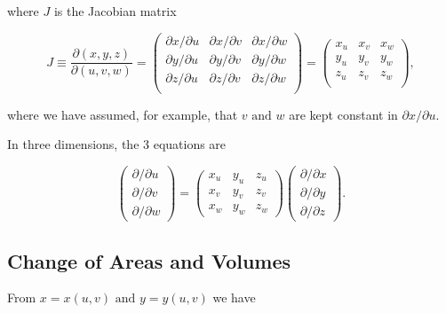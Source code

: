 \documentclass[english,a4paper,12pt]{report}
\begin{document}
where \(J\) is the Jacobian matrix 

\begin{equation}
	J \equiv \frac{\partial (x,y,z)}{\partial (u,v,w)} = \begin{pmatrix}
		\partial x/\partial u  & \partial x/\partial v  & \partial x/\partial w   \\
		\partial y/\partial u  & \partial y/\partial v  & \partial y/\partial w   \\
		\partial z/\partial u  & \partial z/\partial v  & \partial z/\partial w   \\
		\end{pmatrix} = \begin{pmatrix}
			x_{u}  & x_{v}  & x_{w}   \\
			y_{u}  & y_{v}  & y_{w}   \\
			z_{u}  & z_{v}  & z_{w}   \\
		\end{pmatrix},
\end{equation}

where we have assumed, for example, that \(v \text { and } w\) are kept constant in \(\partial x /\partial u \).  

In three dimensions, the 3 equations are

\begin{equation} \label{jacobderi}
		\begin{pmatrix}
			\partial/\partial u \\
			\partial/\partial v \\
			\partial/\partial w
		\end{pmatrix} 
		=
		\begin{pmatrix}
			x_{u} & y_{u} & z_{u} \\
			x_{v} & y_{v} & z_{v} \\
			x_{w} & y_{w} & z_{w}     
		\end{pmatrix}
		\begin{pmatrix}
			\partial/\partial x \\
			\partial/\partial y \\
			\partial/\partial z
		\end{pmatrix} .	
\end{equation} 

\subsection{Change of Areas and Volumes}

From \(x=x(u,v) \text { and } y=y(u,v)\) we have 
\end{document}

